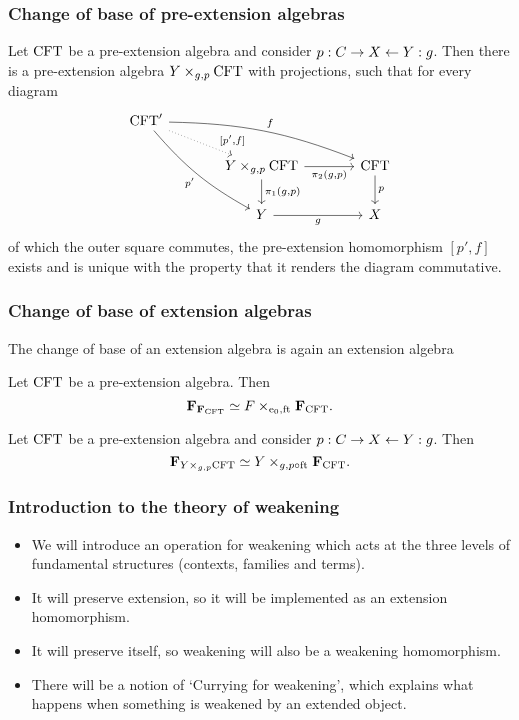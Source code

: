 \documentclass[handout]{beamer}
\begin{document}
\begin{frame}
\frametitle{Change of base of pre-extension algebras}
Let $\mathrm{CFT}$ be a pre-extension algebra and consider $p:C\rightarrow X\leftarrow Y:g$.
Then there is a pre-extension algebra $\cobesys{Y}{\stesys}{g}{p}$ with projections, such that for every diagram
\begin{equation*}
\begin{tikzcd}[ampersand replacement=\&,column sep=large]
\stesys'
  \ar[bend right=10]{ddr}[swap]{p'}
  \ar[bend left=10]{rrd}{f}
  \ar[dotted]{dr}[near end]{[p',f]}
  \\
  {}\&
\cobesys{Y}{\stesys}{g}{p}
  \ar{d}{\pullbackpr{1}{g}{p}}
  \ar{r}[swap]{\pullbackpr{2}{g}{p}}
  \&
\stesys
  \ar{d}{p}
  \\
  {}\&
Y \ar{r}[swap]{g}
  \&
X
\end{tikzcd}
\end{equation*}
of which the outer square commutes, the pre-extension homomorphism $[p',f]$ exists
and is unique with the property that it renders the diagram commutative.
\end{frame}

\begin{frame}
\frametitle{Change of base of extension algebras}
\begin{theorem}
The change of base of an extension algebra is again an extension algebra
\end{theorem}

\begin{theorem}
Let $\mathrm{CFT}$ be a pre-extension algebra. Then
\begin{equation*}
\famesys{\famesys{\stesys}} \simeq \cobesys{\stesysf}{\famesys{\stesys}}{\ectxext}{\eft}.
\end{equation*}
\end{theorem}

\begin{theorem}
Let $\mathrm{CFT}$ be a pre-extension algebra and consider $p:C\rightarrow
X\leftarrow Y:g$. Then
\begin{equation*}
\famesys{\cobesys{Y}{\stesys}{g}{p}}\simeq
\cobesys{Y}{\famesys{\stesys}}{g}{p\circ\eft}.
\end{equation*}
\end{theorem}
\end{frame}

\begin{frame}
\frametitle{Introduction to the theory of weakening}
\begin{itemize}
\item We will introduce an operation for weakening which acts at the three
levels of fundamental structures (contexts, families and terms).
  \pause
\item It will preserve extension, so it will be implemented as an extension
homomorphism.
  \pause
\item It will preserve itself, so weakening will also be a weakening
homomorphism.
  \pause
\item There will be a notion of `Currying for weakening', which explains
what happens when something is weakened by an extended object.
\end{itemize}
\end{frame}
\end{document}
